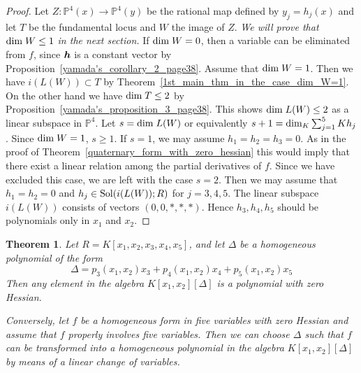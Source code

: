 \documentclass[12pt]{article}
\newtheorem{theorem}{Theorem}[section]
\theoremstyle{definition}
\theoremstyle{remark}
\def\dim{{\rm dim}}
\def\sol{{\rm Sol}}
\def\boldh{\mbox{\boldmath $h$}}
\newcommand {\PP}{\mathbb{P}}
\begin{document}
\begin{proof}
Let $Z:\PP ^{4}(x) \rightarrow \PP ^4(y)$ be the rational map defined by $y_j = h_j(x)$ and 
let $T$ be the fundamental locus and  $W$  the image of $Z$. 
\emph{We will prove that $\dim \; W \leq 1$ in the next section.}
If  $\dim \; W=0$, then
a variable can be eliminated from $f$, since $\boldh$ is a constant vector by %
Proposition~\ref{yamada's_corollary_2_page38}. 
Assume that $\dim\; W=1$.  
Then we have  $i(L(W)) \subset T$ by Theorem~\ref{1st_main_thm_in_the_case_dim_W=1}. 
On the other hand we have  $\dim \;T \leq 2$ by Proposition~\ref{yamada's_proposition_3_page38}. 
This shows $\dim \; L(W) \leq 2$ as a linear subspace in $\PP^{4}$.  
Let $s=\dim \; L(W)$ or equivalently  $s+1=\dim _K\sum _{j=1}^5Kh_j$.  
Since $\dim \; W =1$, $s \geq 1$. 
If $s=1$, we may assume $h_1=h_2=h_3=0$.  As in the proof of Theorem~\ref{quaternary_form_with_zero_hessian}
this would imply that there exist a linear relation among the partial derivatives of $f$. 
Since we have excluded this case,  we are left with the case  $s=2$. 
Then we may assume that  
$h_1=h_2=0$ and $h_j \in \sol(i(L(W)); R)$ for $j=3, 4, 5$. 
The linear subspace  $i(L(W))$  consists of vectors 
$(0,0, \ast, \ast, \ast)$.  Hence $h_3, h_4, h_5$ should be polynomials 
only in $x_1$ and $x_2$. 
\end{proof}

\begin{theorem} \label{thm45}
  Let $R=K[x_1, x_2, x_3, x_4, x_5]$, and let $\Delta$ be a homogeneous polynomial
of the form
$$
\Delta = p_3(x_1,x_2) x_3 + p_4(x_1,x_2) x_4 + p_5(x_1,x_2) x_5
$$
Then any element in the algebra \(K[x_1, x_2][\Delta]\) is a polynomial with zero Hessian.

Conversely, 
let $f$ be a homogeneous form in five variables with zero Hessian and assume that $f$ properly 
involves five variables. 
Then we can choose $\Delta$ such that $f$ can be transformed into a homogeneous polynomial 
in the algebra \(K[x_1, x_2][\Delta]\) by means of a linear change of variables.  
\end{theorem}
\end{document}
